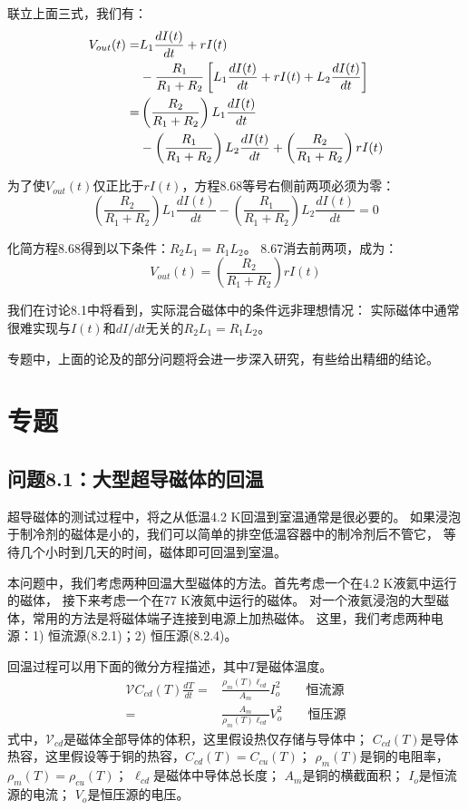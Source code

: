 联立上面三式，我们有：
\begin{align}%
V_{out}(t)=&L_1\frac{dI(t)}{dt}+rI(t) \\\notag
&-\frac{R_1}{R_1+R_2}\left[L_1\frac{dI(t)}{dt}+rI(t)+L_2\frac{dI(t)}{dt}\right] \\\notag
=&\left(\frac{R_2}{R_1+R_2}\right)L_1\frac{dI(t)}{dt} \\\notag
&-\left(\frac{R_1}{R_1+R_2}\right)L_2\frac{dI(t)}{dt}+\left(\frac{R_2}{R_1+R_2}\right)rI(t)
\end{align}

为了使$V_{out}(t)$仅正比于$rI(t)$，方程8.68等号右侧前两项必须为零：
\begin{equation}%
\left(\frac{R_2}{R_1+R_2}\right)L_1\frac{dI(t)}{dt}-\left(\frac{R_1}{R_1+R_2}\right)L_2\frac{dI(t)}{dt}=0
\end{equation}

化简方程8.68得到以下条件：$R_2L_1=R_1L_2$。
8.67消去前两项，成为：
\begin{equation}%
V_{out}(t)=\left(\frac{R_2}{R_1+R_2}\right)rI(t)
\end{equation}

我们在讨论8.1中将看到，实际混合磁体中的条件远非理想情况：
实际磁体中通常很难实现与$I(t)$和$dI/dt$无关的$R_2L_1=R_1L_2$。

专题中，上面的论及的部分问题将会进一步深入研究，有些给出精细的结论。

\section{专题}

\subsection{问题8.1：大型超导磁体的回温}
超导磁体的测试过程中，将之从低温4.2 K回温到室温通常是很必要的。
如果浸泡于制冷剂的磁体是小的，我们可以简单的排空低温容器中的制冷剂后不管它，
等待几个小时到几天的时间，磁体即可回温到室温。

本问题中，我们考虑两种回温大型磁体的方法。首先考虑一个在4.2 K液氦中运行的磁体，
接下来考虑一个在77 K液氮中运行的磁体。
对一个液氦浸泡的大型磁体，常用的方法是将磁体端子连接到电源上加热磁体。
这里，我们考虑两种电源：1) 恒流源(8.2.1)；2) 恒压源(8.2.4)。

回温过程可以用下面的微分方程描述，其中$T$是磁体温度。
\begin{subequations}
	\begin{align}
\mathcal{V}C_{cd}(T)\frac{dT}{dt}=&\frac{\rho_m(T)\ell_{cd}}{A_m}I_{o}^{2} \qquad \mbox{恒流源}\\
=&\frac{A_m}{\rho_m(T)\ell_{cd}}V_{o}^{2} \qquad \mbox{恒压源}
	\end{align}
\end{subequations}
式中，$\mathcal{V}_{cd}$是磁体全部导体的体积，这里假设热仅存储与导体中；
$C_{cd}(T)$是导体热容，这里假设等于铜的热容，$C_{cd}(T)=C_{cu}(T)$；
$\rho_m(T)$是铜的电阻率，$\rho_m(T)=\rho_{cu}(T)$；
$\ell_{cd}$是磁体中导体总长度；
$A_m$是铜的横截面积；
$I_o$是恒流源的电流；
$V_o$是恒压源的电压。


